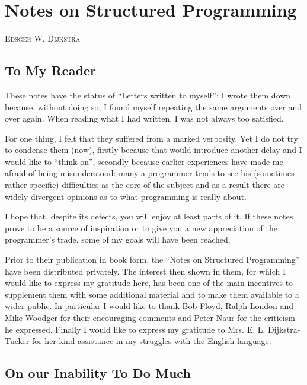 \chapter{Notes on Structured Programming}

{
	\noindent
	\scshape\hfill\small Edsger W. Dijkstra\hfill
}
\renewcommand{\leftmark}{\normalfont\small\hfill E. W. DIJKSTRA\hfill}

\section{To My Reader}

These notes have the status of ``Letters written to myself'': I wrote them down because, without doing so, I found myself repeating the same arguments over and over again. When reading what I had written, I was not always too satisfied.

For one thing, I felt that they suffered from a marked verbosity. Yet I do not try to condense them (now), firstly because that would introduce another delay and I would like to ``think on'', secondly because earlier experiences have made me afraid of being misunderstood: many a programmer tends to see his (sometimes rather specific) difficulties as the core of the subject and as a result there are widely divergent opinions as to what programming is really about.

I hope that, despite its defects, you will enjoy at least parts of it. If these notes prove to be a source of inspiration or to give you a new appreciation of the programmer's trade, some of my goals will have been reached.

Prior to their publication in book form, the ``Notes on Structured Programming'' have been distributed privately. The interest then shown in
them, for which I would like to express my gratitude here, has been one of the main incentives to supplement them with some additional material and to make them available to a wider public. In particular I would like to thank Bob Floyd, Ralph London and Mike Woodger for their encouraging
comments and Peter Naur for the criticism he expressed. Finally I would like to express my gratitude to Mrs. E. L. Dijkstra-Tucker for her kind
assistance in my struggles with the English language.

\section{On our Inability To Do Much}

